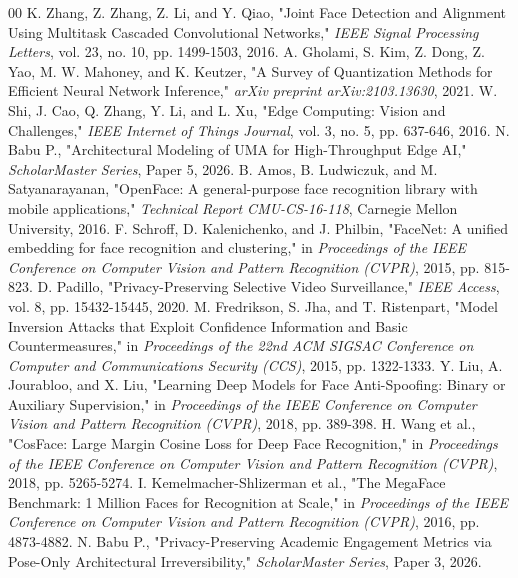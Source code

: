 \documentclass[conference]{IEEEtran}
\begin{document}
\begin{thebibliography}{00}
 K. Zhang, Z. Zhang, Z. Li, and Y. Qiao, "Joint Face Detection and Alignment Using Multitask Cascaded Convolutional Networks," \textit{IEEE Signal Processing Letters}, vol. 23, no. 10, pp. 1499-1503, 2016.
 A. Gholami, S. Kim, Z. Dong, Z. Yao, M. W. Mahoney, and K. Keutzer, "A Survey of Quantization Methods for Efficient Neural Network Inference," \textit{arXiv preprint arXiv:2103.13630}, 2021.
 W. Shi, J. Cao, Q. Zhang, Y. Li, and L. Xu, "Edge Computing: Vision and Challenges," \textit{IEEE Internet of Things Journal}, vol. 3, no. 5, pp. 637-646, 2016.
 N. Babu P., "Architectural Modeling of UMA for High-Throughput Edge AI," \textit{ScholarMaster Series}, Paper 5, 2026.
 B. Amos, B. Ludwiczuk, and M. Satyanarayanan, "OpenFace: A general-purpose face recognition library with mobile applications," \textit{Technical Report CMU-CS-16-118}, Carnegie Mellon University, 2016.
 F. Schroff, D. Kalenichenko, and J. Philbin, "FaceNet: A unified embedding for face recognition and clustering," in \textit{Proceedings of the IEEE Conference on Computer Vision and Pattern Recognition (CVPR)}, 2015, pp. 815-823.
 D. Padillo, "Privacy-Preserving Selective Video Surveillance," \textit{IEEE Access}, vol. 8, pp. 15432-15445, 2020.
 M. Fredrikson, S. Jha, and T. Ristenpart, "Model Inversion Attacks that Exploit Confidence Information and Basic Countermeasures," in \textit{Proceedings of the 22nd ACM SIGSAC Conference on Computer and Communications Security (CCS)}, 2015, pp. 1322-1333.
 Y. Liu, A. Jourabloo, and X. Liu, "Learning Deep Models for Face Anti-Spoofing: Binary or Auxiliary Supervision," in \textit{Proceedings of the IEEE Conference on Computer Vision and Pattern Recognition (CVPR)}, 2018, pp. 389-398.
 H. Wang et al., "CosFace: Large Margin Cosine Loss for Deep Face Recognition," in \textit{Proceedings of the IEEE Conference on Computer Vision and Pattern Recognition (CVPR)}, 2018, pp. 5265-5274.
 I. Kemelmacher-Shlizerman et al., "The MegaFace Benchmark: 1 Million Faces for Recognition at Scale," in \textit{Proceedings of the IEEE Conference on Computer Vision and Pattern Recognition (CVPR)}, 2016, pp. 4873-4882.
 N. Babu P., "Privacy-Preserving Academic Engagement Metrics via Pose-Only Architectural Irreversibility," \textit{ScholarMaster Series}, Paper 3, 2026.

\end{thebibliography}
\end{document}
